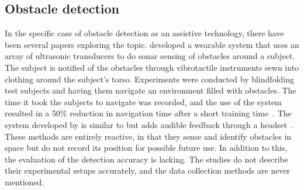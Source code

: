\documentclass[prodmode,acmtosem]{acmsmall} %
\begin{document}
\subsection{Obstacle detection}
In the specific case of obstacle detection as an assistive technology, there have been several papers exploring the topic. \citet{Cardin2007} developed a wearable system that uses an array of ultrasonic transducers to do sonar sensing of obstacles around a subject. The subject is notified of the obstacles through vibrotactile instruments sewn into clothing around the subject's torso. Experiments were conducted by blindfolding test subjects and having them navigate an environment filled with obstacles. The time it took the subjects to navigate was recorded, and the use of the system resulted in a 50\% reduction in navigation time after a short training time~\cite{Cardin2007}. The system developed by \citet{Shin2007} is similar to \citet{Cardin2007} but adds audible feedback through a headset~\cite{Shin2007}. These methods are entirely reactive, in that they sense and identify obstacles in space but do not record its position for possible future use. In addition to this, the evaluation of the detection accuracy is lacking. The studies do not describe their experimental setups accurately, and the data collection methods are never mentioned.
\end{document}
